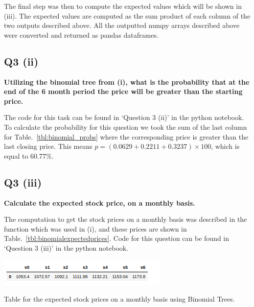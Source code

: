 \noindent
The final step was then to compute the expected values which will be shown in (iii). The expected values are computed as the sum product of each column of the two outputs described above. All the outputted numpy arrays described above were converted and returned as pandas dataframes. 



\subsection{Q3 (ii)}\label{sssec:pt1q3ii}
\textbf{Utilizing the binomial tree from (i), what is the probability that at the end of the 6 month period
the price will be greater than the starting price.}

\noindent
The code for this task can be found in ‘Question 3 (ii)’ in the python notebook. To calculate the probability for this question we took the sum of the last column for Table.~\ref{tbl:binomial_probs} where the corresponding price is greater than the last closing price. This means $p = (0.0629 + 0.2211 + 0.3237) \times 100 $, which is equal to 60.77\%. 



\subsection{Q3 (iii)}\label{sssec:pt1q3iii}
\textbf{Calculate the expected stock price, on a monthly basis.}

\noindent
The computation to get the stock prices on a monthly basis was described in the function which was used in (i), and these prices are shown in Table.~\ref{tbl:binomialexpectedprices}. Code for this question can be found in ‘Question 3 (iii)’ in the python notebook.

\begin{table}[H]
    \includegraphics[width=\linewidth]{imgs/binomial_prices_monthly.png}
    \caption{Table for the expected stock prices on a monthly basis using Binomial Trees.}
    \label{tbl:binomialexpectedprices}
\end{table}

